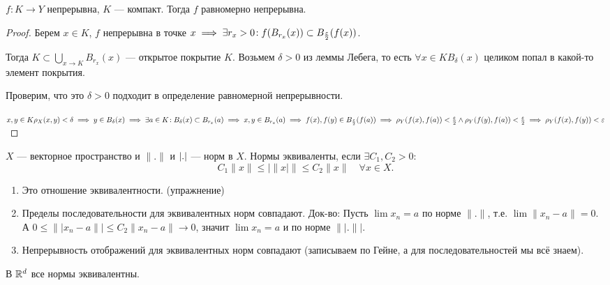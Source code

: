 \begin{theorem}
    $f\!: K \to Y$ непрерывна,  $K$ --- компакт. Тогда  $f$ равномерно непрерывна. 
\end{theorem}
\begin{proof}
    Берем $x \in K$,  $f$ непрерывна в точке  $x \implies \exists r_x > 0\!: f(B_{r_x}(x)) \subset B_{\frac{\varepsilon}{2}}(f(x))$. 

    Тогда $K \subset \bigcup\limits_{x \to K} B_{r_x}(x)$ --- открытое покрытие $K$. Возьмем  $\delta > 0$ из леммы Лебега, то есть  $\forall x \in K B_\delta(x)$ целиком попал в какой-то элемент покрытия. 

    Проверим, что это  $\delta > 0$ подходит в определение равномерной непрерывности.

     $x, y \in K \rho_X(x, y) < \delta \implies y \in B_\delta(x) \implies \exists a \in K\!: B_\delta(x) \subset B_{r_x}(a) \implies x, y \in B_{r_a}(a) \implies f(x), f(y) \in B_{\frac{\varepsilon}{2}}(f(a)) \implies \rho_Y(f(x), f(a)) < \frac{\varepsilon}{2} \land \rho_Y(f(y), f(a)) < \frac{\varepsilon}{2} \implies \rho_Y(f(x), f(y)) < \varepsilon$
\end{proof}
\begin{definition}
    $X$ --- векторное пространство и  $\| . \|$ и  $\\| . \\|$ --- норм в  $X$. 
    Нормы эквиваленты, если $\exists C_1, C_2 > 0$\!: 
    \[
    C_1 \| x\| \le |\| x |\| \le C_2 \| x \| \quad \forall x \in X
    .\] 
\end{definition}
\begin{remark}
    \begin{enumerate}
        \item Это отношение эквивалентности. (упражнение)
        \item Пределы последовательности для эквивалентных норм совпадают. Док-во:
        Пусть $\lim x_n = a$ по норме $\|.\|$, т.е. $\lim \|x_n - a\| = 0$. А $0 \le \||x_n - a\|| \le C_2 \|x_n - a\| \rightarrow 0$, значит $\lim x_n = a$ и по норме $\||.\||$.
        \item Непрерывность отображений для эквивалентных норм совпадают (записываем по Гейне, а для последовательностей мы всё знаем).
    \end{enumerate}
\end{remark}
\begin{theorem}
   В $\mathbb{R}^d$ все нормы эквивалентны. 
\end{theorem}
